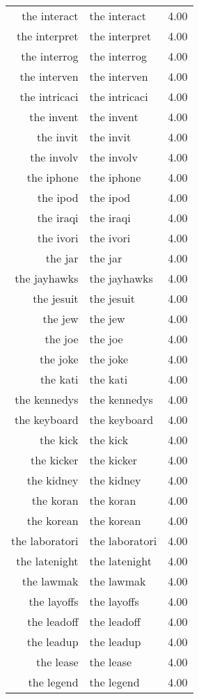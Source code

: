 \begin{table}[ht]
\begin{tabular}{rlr}
  the interact & the interact & 4.00 \\ 
  the interpret & the interpret & 4.00 \\ 
  the interrog & the interrog & 4.00 \\ 
  the interven & the interven & 4.00 \\ 
  the intricaci & the intricaci & 4.00 \\ 
  the invent & the invent & 4.00 \\ 
  the invit & the invit & 4.00 \\ 
  the involv & the involv & 4.00 \\ 
  the iphone & the iphone & 4.00 \\ 
  the ipod & the ipod & 4.00 \\ 
  the iraqi & the iraqi & 4.00 \\ 
  the ivori & the ivori & 4.00 \\ 
  the jar & the jar & 4.00 \\ 
  the jayhawks & the jayhawks & 4.00 \\ 
  the jesuit & the jesuit & 4.00 \\ 
  the jew & the jew & 4.00 \\ 
  the joe & the joe & 4.00 \\ 
  the joke & the joke & 4.00 \\ 
  the kati & the kati & 4.00 \\ 
  the kennedys & the kennedys & 4.00 \\ 
  the keyboard & the keyboard & 4.00 \\ 
  the kick & the kick & 4.00 \\ 
  the kicker & the kicker & 4.00 \\ 
  the kidney & the kidney & 4.00 \\ 
  the koran & the koran & 4.00 \\ 
  the korean & the korean & 4.00 \\ 
  the laboratori & the laboratori & 4.00 \\ 
  the latenight & the latenight & 4.00 \\ 
  the lawmak & the lawmak & 4.00 \\ 
  the layoffs & the layoffs & 4.00 \\ 
  the leadoff & the leadoff & 4.00 \\ 
  the leadup & the leadup & 4.00 \\ 
  the lease & the lease & 4.00 \\ 
  the legend & the legend & 4.00 \\ 

\end{tabular}
\end{table}
